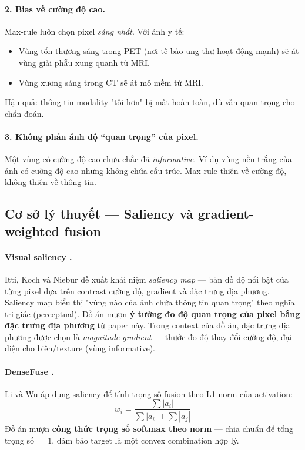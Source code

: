 \paragraph{2. Bias về cường độ cao.}
Max-rule luôn chọn pixel \emph{sáng nhất}. Với ảnh y tế:
\begin{itemize}\itemsep0pt
    \item Vùng tổn thương sáng trong PET (nơi tế bào ung thư hoạt động mạnh) sẽ át vùng giải phẫu xung quanh từ MRI.
    \item Vùng xương sáng trong CT sẽ át mô mềm từ MRI.
\end{itemize}
Hậu quả: thông tin modality "tối hơn" bị mất hoàn toàn, dù vẫn quan trọng cho chẩn đoán.

\paragraph{3. Không phản ánh độ ``quan trọng'' của pixel.}
Một vùng có cường độ cao chưa chắc đã \emph{informative}. Ví dụ vùng nền trắng của ảnh có cường độ cao nhưng không chứa cấu trúc. Max-rule thiên về cường độ, không thiên về thông tin.

\subsection{Cơ sở lý thuyết --- Saliency và gradient-weighted fusion}

\paragraph{Visual saliency \cite{itti1998saliency}.}
Itti, Koch và Niebur đề xuất khái niệm \emph{saliency map} --- bản đồ độ nổi bật của từng pixel dựa trên contrast cường độ, gradient và đặc trưng địa phương. Saliency map biểu thị "vùng nào của ảnh chứa thông tin quan trọng" theo nghĩa tri giác (perceptual). Đồ án mượn \textbf{ý tưởng đo độ quan trọng của pixel bằng đặc trưng địa phương} từ paper này. Trong context của đồ án, đặc trưng địa phương được chọn là \emph{magnitude gradient} --- thước đo độ thay đổi cường độ, đại diện cho biên/texture (vùng informative).

\paragraph{DenseFuse \cite{li2019densefuse}.}
Li và Wu áp dụng saliency để tính trọng số fusion theo L1-norm của activation:
\begin{equation}
w_i = \frac{\sum |a_i|}{\sum |a_i| + \sum |a_j|}
\end{equation}
Đồ án mượn \textbf{công thức trọng số softmax theo norm} --- chia chuẩn để tổng trọng số $= 1$, đảm bảo target là một convex combination hợp lý.

